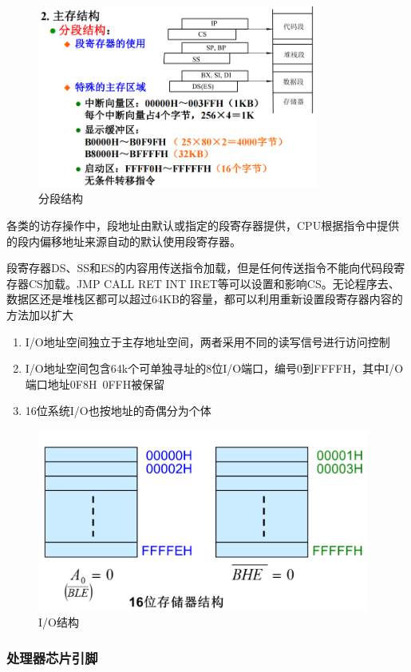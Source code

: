 \documentclass{article}
\begin{document}
\begin{figure}[H]
    \centering
    \includegraphics[height=6cm]{img/2.1-6.png}
    \caption{分段结构}
\end{figure}

各类的访存操作中，段地址由默认或指定的段寄存器提供，CPU根据指令中提供的段内偏移地址来源自动的默认使用段寄存器。

段寄存器DS、SS和ES的内容用传送指令加载，但是任何传送指令不能向代码段寄存器CS加载。JMP CALL RET INT IRET等可以设置和影响CS。无论程序去、数据区还是堆栈区都可以超过64KB的容量，都可以利用重新设置段寄存器内容的方法加以扩大


\begin{enumerate}
    \item I/O地址空间独立于主存地址空间，两者采用不同的读写信号进行访问控制
    \item I/O地址空间包含64k个可单独寻址的8位I/O端口，编号0到FFFFH，其中I/O端口地址0F8H~0FFH被保留
    \item 16位系统I/O也按地址的奇偶分为个体
\end{enumerate}
\begin{figure}[H]
    \centering
    \includegraphics[height=6cm]{img/2.1-8.png}
    \caption{I/O结构}
\end{figure}

\subsubsection{处理器芯片引脚}
\end{document}
